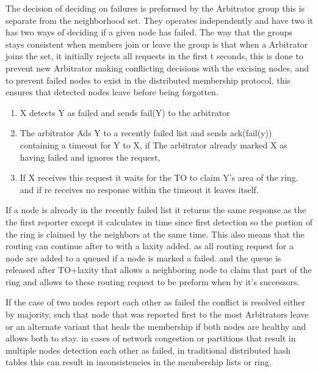 \documentclass[a4paper,10pt,titlepage]{report}
\begin{document}
    The decision of deciding on failures is preformed by the Arbitrator group this is separate from the neighborhood set. They operates independently and have two it has two ways of deciding if a given node has failed. The way that the groups stays consistent when members join or leave the group is that when a Arbitrator joins the set, it initially rejects all requests in the first t seconds, this is done to prevent new Arbitrator making conflicting decisions with the excising nodes, and to prevent failed nodes to exist in the distributed membership protocol. this ensures that detected nodes leave before being forgotten.\\
    \vspace{5mm}

    \begin{enumerate}
        \item X detects Y as failed and sends fail(Y) to the arbitrator
        \item The arbitrator Ads Y to a recently failed list and sends ack(fail(y)) containing a timeout for Y to X, if The arbitrator already marked X as having failed and ignores the request,
        \item If X receives this request it waits for the TO to claim Y's area of the ring. and if re receives no response within the timeout it leaves itself.
    \end{enumerate}

    If a node is already in the recently failed list it returns the same response as the the first reporter except it calculates in time since first detection so the portion of the ring is claimed by the neighbors at the same time. This also means that the routing can continue after to with a laxity added. as all routing request for a node are added to a queued if a node is marked a failed. and the queue is released after TO+laxity that allows a neighboring node to claim that part of the ring and allows to these routing request to be preform when by it's successors.\\
    \vspace{5mm}

    If the case of two nodes report each other as failed the conflict is resolved either by majority, such that node that was reported first to the most Arbitrators leave or an alternate variant that heals the membership if both nodes are healthy and allows both to stay. in cases of network congestion or partitions that result in multiple nodes detection each other as failed, in traditional distributed hash tables this can result in inconsistencies in the membership lists or ring. \\
    \vspace{5mm}
\end{document}
